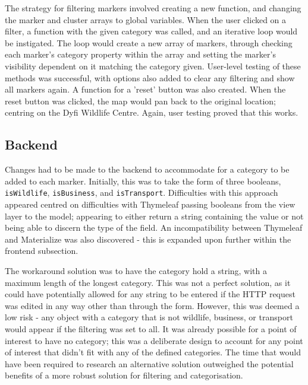 The strategy for filtering markers involved creating a new function, and changing the marker and cluster arrays to global variables. When the user clicked on a filter, a function with the given category was called, and an iterative loop would be instigated. The loop would create a new array of markers, through checking each marker's category property within the array and setting the marker's visibility dependent on it matching the category given. User-level testing of these methods was successful, with options also added to clear any filtering and show all markers again. A function for a 'reset' button was also created. When the reset button was clicked, the map would pan back to the original location; centring on the Dyfi Wildlife Centre. Again, user testing proved that this works.

\subsection{Backend}

Changes had to be made to the backend to accommodate for a category to be added to each marker. Initially, this was to take the form of three booleans, \texttt{isWildlife}, \texttt{isBusiness}, and \texttt{isTransport}. Difficulties with this approach appeared centred on difficulties with Thymeleaf passing booleans from the view layer to the model; appearing to either return a string containing the value or not being able to discern the type of the field. An incompatibility between Thymeleaf and Materialize was also discovered - this is expanded upon further within the frontend subsection.

The workaround solution was to have the category hold a string, with a maximum length of the longest category. This was not a perfect solution, as it could have potentially allowed for any string to be entered if the HTTP request was edited in any way other than through the form. However, this was deemed a low risk - any object with a category that is not wildlife, business, or transport would appear if the filtering was set to all. It was already possible for a point of interest to have no category; this was a deliberate design to account for any point of interest that didn't fit with any of the defined categories. The time that would have been required to research an alternative solution outweighed the potential benefits of a more robust solution for filtering and categorisation.

